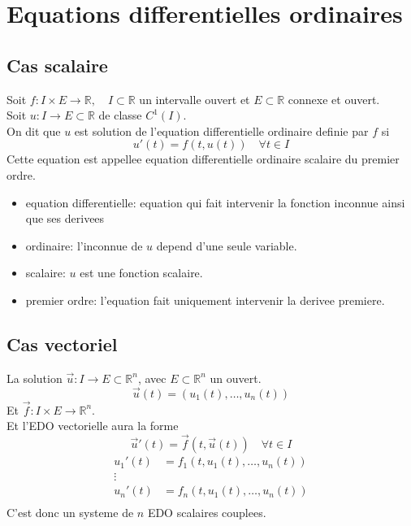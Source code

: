 \documentclass[../main.tex]{subfiles}
\begin{document}
\section{Equations differentielles ordinaires}
\subsection*{Cas scalaire}
Soit $f: I \times E \to \mathbb{R},\quad I \subset \mathbb{R}$ un intervalle ouvert et $E \subset \mathbb{R}$ connexe et ouvert.\\
Soit $u : I \to E \subset \mathbb{R}$ de classe $C^{1}( I) $.\\
On dit que $u$ est solution de l'equation differentielle ordinaire definie par $f$ si 
\[ 
	u'( t) = f( t, u( t) ) \quad \forall t \in I
\]
Cette equation est appellee equation differentielle ordinaire scalaire du premier ordre.
\begin{itemize}
\item equation differentielle: equation qui fait intervenir la fonction inconnue ainsi que ses derivees
\item ordinaire: l'inconnue de $u$ depend d'une seule variable.
\item scalaire: $u$ est une fonction scalaire.
\item premier ordre: l'equation fait uniquement intervenir la derivee premiere.
\end{itemize}
\subsection*{Cas vectoriel}
La solution $\vec{u}: I \to E \subset \mathbb{R}^n$, avec $E \subset \mathbb{R}^n$ un ouvert.
\[ 
	\vec{u}( t) = ( u_1( t) , \ldots, u_n( t) ) 
\]
Et $\vec{f}: I \times E \to \mathbb{R}^n$.\\
Et l'EDO vectorielle aura la forme
\[ 
	\vec{u}'( t) = \vec{f}( t,\vec{u}( t) ) \quad \forall t \in I
\]
\begin{align*}
	u_1'( t) &= f_1( t, u_1( t) ,\ldots, u_n( t) ) \\
	\vdots &\\
	u_n'( t) &= f_n( t, u_1( t) ,\ldots, u_n( t) ) \\
\end{align*}
C'est donc un systeme de $n$ EDO scalaires couplees.
\end{document}
